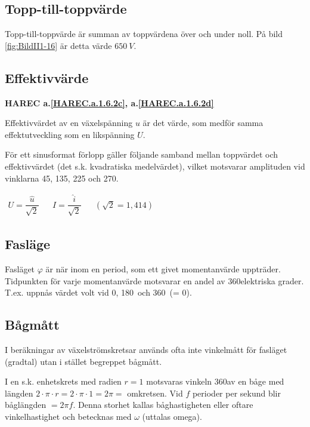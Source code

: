 \subsection{Topp-till-toppvärde}

Topp-till-toppvärde är summan av toppvärdena över och under noll.
På bild \ref{fig:BildII1-16} är detta värde \(650\ V\).

\subsection{Effektivvärde}
\textbf{HAREC a.\ref{HAREC.a.1.6.2c}, a.\ref{HAREC.a.1.6.2d}\label{myHAREC.a.1.6.2c}\label{myHAREC.a.1.6.2d}}

Effektivvärdet av en växelspänning \(u\) är det värde, som medför samma
effektutveckling som en likspänning \(U\).

För ett sinusformat förlopp gäller följande samband mellan toppvärdet och
effektivvärdet (det s.k. kvadratiska medelvärdet), vilket motsvarar amplituden
vid vinklarna 45, 135, 225 och 270\degree.

\(
\begin{array}{lllll}
U=\dfrac{\hat{u}}{\sqrt{2}} & & I=\dfrac{\hat{i}}{\sqrt{2}} & & (\sqrt{2} = 1,414)
\end{array}
\)

\subsection{Fasläge}

Fasläget \(\varphi\) är när inom en period, som ett givet momentanvärde
uppträder.
Tidpunkten för varje momentanvärde motsvarar en andel av 360\degree elektriska
grader.
T.ex. uppnås värdet volt vid 0\degree, 180\degree~och 360\degree~(= 0\degree).

\subsection{Bågmått}

I beräkningar av växelströmskretsar används ofta inte vinkelmått för fasläget
(gradtal) utan i stället begreppet bågmått.

I en s.k. enhetskrets med radien \(r = 1\) motsvaras vinkeln 360\degree av en
båge med längden \(2 \cdot \pi \cdot r= 2 \cdot \pi \cdot 1 = 2 \pi =\)
omkretsen.
Vid \(f\) perioder per sekund blir båglängden \(= 2\pi f\).
Denna storhet kallas båghastigheten eller oftare vinkelhastighet och betecknas
med \(\omega\) (uttalas omega).

